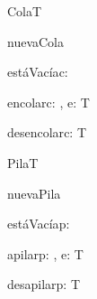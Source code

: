 \begin{tad}{Cola}{T}

	\begin{proc}{nuevaCola}{}{\tadtype}
	\end{proc}

	\begin{proc}{estáVacía}{\In c: \tadtype}{\bool}
	\end{proc}

	\begin{proc}{encolar}{\Inout c: \tadtype, \In e: T}{}
	\end{proc}

	\begin{proc}{desencolar}{\Inout c: \tadtype}{T}
	\end{proc}
\end{tad}

\begin{tad}{Pila}{T}

	\begin{proc}{nuevaPila}{}{\tadtype}
	\end{proc}

	\begin{proc}{estáVacía}{\In p: \tadtype}{\bool}
	\end{proc}

	\begin{proc}{apilar}{\Inout p: \tadtype, \In e: T}{}
	\end{proc}

	\begin{proc}{desapilar}{\Inout p: \tadtype}{T}
	\end{proc}
\end{tad}

